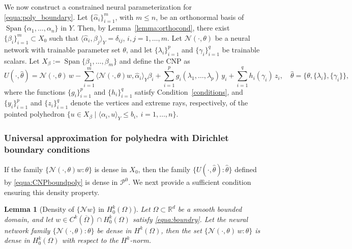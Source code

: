 \documentclass{article}
\numberwithin{equation}{section}
\newtheorem{lemma}{Lemma}[section]
\begin{document}
We now construct a constrained neural parameterization for \eqref{equa:poly_boundary}. Let $\{\hat{\alpha}_i\}_{i=1}^m$, with $m\le n$, be an orthonormal basis of $\operatorname{Span}\{\alpha_1,\dots,\alpha_n\}$ in $Y$. Then, by Lemma~\ref{lemma:orthocond}, there exist $\{\beta_i\}_{i=1}^m\subset X_0$ such that $\langle \hat{\alpha}_i,\beta_j\rangle_Y=\delta_{ij}$, $i,j=1,\dots,m$. Let $\mathcal{N}(\cdot,\theta)$ be a neural network with trainable parameter set $\theta$, and let $\{\lambda_i\}_{i=1}^p$ and $\{\gamma_i\}_{i=1}^q$ be trainable scalars. Let  $X_\beta:=\operatorname{Span}\{\beta_1,\dots,\beta_m\}$ and define the CNP as
\begin{equation}\label{equa:CNPboundpoly}
    U(\cdot,\hat{\theta})
    =
    \mathcal{N}(\cdot,\theta)\,w
    -
    \sum_{i=1}^m \langle \mathcal{N}(\cdot,\theta)w,\hat{\alpha}_i\rangle_Y \beta_i
    +
    \sum_{i=1}^p g_i(\lambda_1,\dots,\lambda_p)\,y_i
    +
    \sum_{i=1}^q h_i(\gamma_i)\,z_i, \quad \hat{\theta} = \{\theta, \{\lambda_i\},\{\gamma_i\}\},
\end{equation}
where the functions $\{g_i\}_{i=1}^p$ and $\{h_i\}_{i=1}^q$ satisfy Condition~\ref{conditions}, and $\{y_i\}_{i=1}^p$ and $\{z_i\}_{i=1}^q$ denote the vertices and extreme rays, respectively, of the pointed polyhedron $\{u\in X_\beta\mid \langle \alpha_i,u\rangle_Y\le b_i,\ i=1,\dots,n\}$.


\subsubsection*{Universal approximation for polyhedra with Dirichlet boundary conditions}

If the family $\{\mathcal{N}(\cdot,\theta)w:\theta\}$ is dense in $X_0$, then the family $\{U(\cdot,\hat{\theta}):\hat{\theta}\}$ defined by \eqref{equa:CNPboundpoly} is dense in $\mathcal{P}^0$. We next provide a sufficient condition ensuring this density property.


\begin{lemma}[Density of \(\{\mathcal N w\}\) in \(H_0^k(\Omega)\)]
\label{lem:density_wN_X0}
Let $\Omega\subset\mathbb{R}^d$ be a smooth bounded domain, and let $w\in C^k(\overline{\Omega})\cap H_0^k(\Omega)$ satisfy \eqref{equa:boundry}. Let the neural network family $\{\mathcal N(\cdot,\theta):\theta\}$ be dense in $H^k(\Omega)$, then the set $\{\mathcal N(\cdot,\theta)\,w:\theta\}$ is dense in \(H_0^k(\Omega)\) with respect to the \(H^k\)-norm.
\end{lemma}
\end{document}
